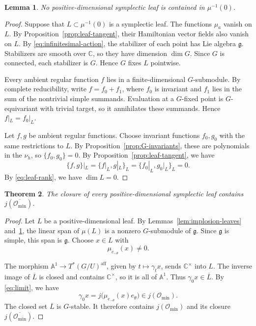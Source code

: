 \documentclass[12pt]{article}
\theoremstyle{paperplain}
\newtheorem{theorem}{Theorem}[section]
\newtheorem{lemma}[theorem]{Lemma}
\theoremstyle{paperdefinition}
\newcommand{\C}{\mathbb C}
\newcommand{\Omin}{\mathcal O_{\min}}
\newcommand{\g}{\mathfrak g}
\begin{document}
\setlength{\abovedisplayskip}{5pt plus 2pt minus 2pt}
\setlength{\belowdisplayskip}{5pt plus 2pt minus 2pt}
\setlength{\abovedisplayshortskip}{0pt plus 2pt}
\setlength{\belowdisplayshortskip}{3pt plus 2pt minus 2pt}
\begin{lemma}\label{lem:moment-nonzero}
    No positive-dimensional symplectic leaf is contained in $\mu^{-1}(0)$.
\end{lemma}

\begin{proof}
    Suppose that $L\subset\mu^{-1}(0)$ is a symplectic leaf. The functions $\mu_a$ vanish on $L$. By Proposition~\ref{prop:leaf-tangent}, their Hamiltonian vector fields also vanish on $L$. By \eqref{eq:infinitesimal-action}, the stabilizer of each point has Lie algebra $\g$. Stabilizers are smooth over $\C$, so they have dimension $\dim G$. Since $G$ is connected, each stabilizer is $G$. Hence $G$ fixes $L$ pointwise.

    Every ambient regular function $f$ lies in a finite-dimensional $G$-submodule. By complete reducibility, write $f=f_0+f_1$, where $f_0$ is invariant and $f_1$ lies in the sum of the nontrivial simple summands. Evaluation at a $G$-fixed point is $G$-equivariant with trivial target, so it annihilates these summands. Hence $f|_L=f_0|_L$.

    Let $f,g$ be ambient regular functions. Choose invariant functions $f_0,g_0$ with the same restrictions to $L$. By Proposition~\ref{prop:G-invariants}, these are polynomials in the $\nu_h$, so $\{f_0,g_0\}=0$. By Proposition~\ref{prop:leaf-tangent}, we have
    $$
        \{f,g\}|_L
        =\{f|_L,g|_L\}_L
        =\{f_0|_L,g_0|_L\}_L=0.
    $$
    By \eqref{eq:leaf-rank}, we have $\dim L=0$.
\end{proof}

\newpage
\setlength{\abovedisplayskip}{5pt plus 2pt minus 2pt}
\setlength{\belowdisplayskip}{5pt plus 2pt minus 2pt}
\setlength{\abovedisplayshortskip}{0pt plus 2pt}
\setlength{\belowdisplayshortskip}{3pt plus 2pt minus 2pt}
\begin{theorem}\label{thm:leaf-closure}
    The closure of every positive-dimensional symplectic leaf contains $j(\overline{\Omin})$.
\end{theorem}

\begin{proof}
    Let $L$ be a positive-dimensional leaf. By Lemmas~\ref{lem:implosion-leaves} and~\ref{lem:moment-nonzero}, the linear span of $\mu(L)$ is a nonzero $G$-submodule of $\g$. Since $\g$ is simple, this span is $\g$. Choose $x\in L$ with
    $$
        \mu_{e_{-\theta}}(x)\ne0.
    $$

    The morphism $\mathbb A^1\to T^*(G/U)^{\mathrm{aff}}$, given by $t\mapsto\gamma_t x$, sends $\C^\times$ into $L$. The inverse image of $\overline L$ is closed and contains $\C^\times$, so it is all of $\mathbb A^1$. Thus $\gamma_0x\in\overline L$. By \eqref{eq:limit}, we have
    $$
        \gamma_0x=j\bigl(\mu_{e_{-\theta}}(x)e_\theta\bigr)\in j(\Omin).
    $$
    The closed set $\overline L$ is $G$-stable. It therefore contains $j(\Omin)$ and its closure $j(\overline{\Omin})$.
\end{proof}
\end{document}
